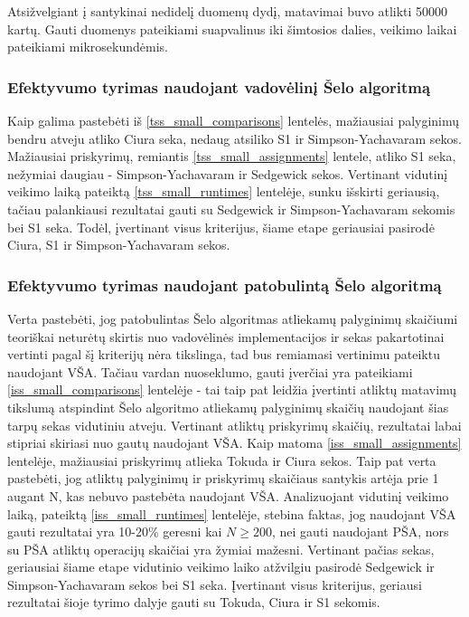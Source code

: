 \documentclass{VUMIFInfKursinis}
\begin{document}
Atsižvelgiant į santykinai nedidelį duomenų dydį, matavimai buvo atlikti 50000 kartų.
Gauti duomenys pateikiami suapvalinus iki šimtosios dalies, veikimo laikai pateikiami mikrosekundėmis.

\subsubsection{Efektyvumo tyrimas naudojant vadovėlinį Šelo algoritmą}

Kaip galima pastebėti iš \ref{tss_small_comparisons} lentelės, mažiausiai palyginimų bendru atveju atliko Ciura seka,
nedaug atsiliko S1 ir Simpson-Yachavaram sekos. Mažiausiai priskyrimų, remiantis \ref{tss_small_assignments} lentele, atliko S1 seka, nežymiai daugiau - Simpson-Yachavaram ir Sedgewick sekos.
Vertinant vidutinį veikimo laiką pateiktą \ref{tss_small_runtimes} lentelėje, sunku išskirti geriausią,
tačiau palankiausi rezultatai gauti su Sedgewick ir Simpson-Yachavaram sekomis bei S1 seka.
Todėl, įvertinant visus kriterijus, šiame etape geriausiai pasirodė Ciura, S1 ir Simpson-Yachavaram sekos.

\subsubsection{Efektyvumo tyrimas naudojant patobulintą Šelo algoritmą}

Verta pastebėti, jog patobulintas Šelo algoritmas atliekamų palyginimų skaičiumi teoriškai neturėtų skirtis nuo vadovėlinės implementacijos ir
sekas pakartotinai vertinti pagal šį kriterijų nėra tikslinga, tad bus remiamasi vertinimu pateiktu naudojant VŠA.
Tačiau vardan nuoseklumo, gauti įverčiai yra pateikiami \ref{iss_small_comparisons} lentelėje - tai taip pat leidžia įvertinti atliktų matavimų tikslumą atspindint
Šelo algoritmo atliekamų palyginimų skaičių naudojant šias tarpų sekas vidutiniu atveju.
Vertinant atliktų priskyrimų skaičių, rezultatai labai stipriai skiriasi nuo gautų naudojant VŠA.
Kaip matoma \ref{iss_small_assignments} lentelėje, mažiausiai priskyrimų atlieka Tokuda ir Ciura sekos.
Taip pat verta pastebėti, jog atliktų palyginimų ir priskyrimų skaičiaus santykis artėja prie 1 augant N, kas nebuvo pastebėta naudojant VŠA.
Analizuojant vidutinį veikimo laiką, pateiktą \ref{iss_small_runtimes} lentelėje, stebina faktas, jog
naudojant VŠA gauti rezultatai yra 10-20\% geresni kai $N \geq 200$, nei gauti naudojant PŠA, nors su PŠA atliktų operacijų skaičiai yra žymiai mažesni.
Vertinant pačias sekas, geriausiai šiame etape vidutinio veikimo laiko atžvilgiu pasirodė Sedgewick ir Simpson-Yachavaram sekos bei S1 seka.
Įvertinant visus kriterijus, geriausi rezultatai šioje tyrimo dalyje gauti su Tokuda, Ciura ir S1 sekomis.
\end{document}
